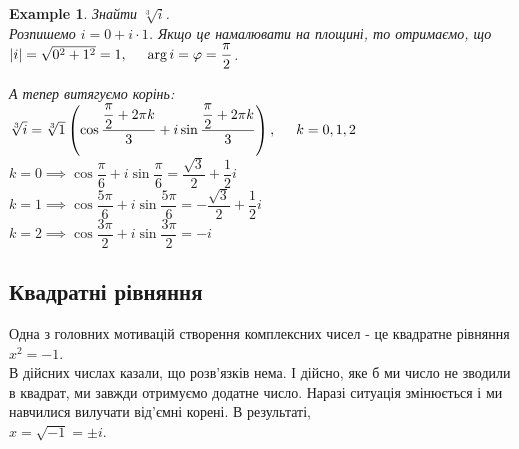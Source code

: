 \documentclass[a4paper, 10pt]{article}
\theoremstyle{theoremdd}
\theoremstyle{theoremdd}
\theoremstyle{theoremdd}
\theoremstyle{theoremdd}
\newtheorem{example}[theorem]{Example}
\theoremstyle{theoremdd}
\theoremstyle{theoremdd}
\theoremstyle{theoremdd}
\theoremstyle{theoremdd}
\begin{document}
\begin{example}
Знайти $\sqrt[3]{i}$.\\
Розпишемо $i = 0 + i \cdot 1$. Якщо це намалювати на площині, то отримаємо, що \\ $|i| = \sqrt{0^2+1^2} = 1, \hspace{0.5cm} \arg i = \varphi = \dfrac{\pi}{2}$.
\begin{figure}[H]
\centering
{}
\end{figure}
А тепер витягуємо корінь:\\
$\sqrt[3]{i} = \sqrt[3]{1} \left( \cos \dfrac{\dfrac{\pi}{2} + 2 \pi k}{3} + i \sin \dfrac{\dfrac{\pi}{2} + 2 \pi k}{3} \right), \hspace{0.5cm} k=0,1,2$\\
$k = 0 \implies \cos \dfrac{\pi}{6} + i \sin \dfrac{\pi}{6} = \dfrac{\sqrt{3}}{2} + \dfrac{1}{2}i$\\
$k = 1 \implies \cos \dfrac{5 \pi}{6} + i \sin \dfrac{5 \pi}{6} = -\dfrac{\sqrt{3}}{2} + \dfrac{1}{2}i$\\
$k = 2 \implies \cos \dfrac{3 \pi}{2} + i \sin \dfrac{3 \pi}{2} = -i$
\begin{figure}[H]
\centering
{}
\end{figure}
\end{example}

\subsection{Квадратні рівняння}
Одна з головних мотивацій створення комплексних чисел - це квадратне рівняння $x^2 = -1$.\\
В дійсних числах казали, що розв'язків нема. І дійсно, яке б ми число не зводили в квадрат, ми завжди отримуємо додатне число. Наразі ситуація змінюється і ми навчилися вилучати від'ємні корені. В результаті, \\
$x = \sqrt{-1} = \pm i$.
\end{document}
